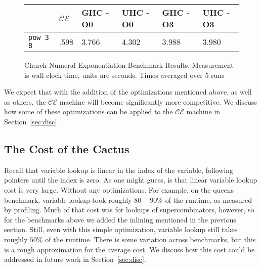 \begin{figure*}
\begin{tabularx}{\textwidth}{l | X | X | X | X | X}
& $\mathcal{CE}$ & GHC -O0 & UHC -O0 & GHC -O3 & UHC -O3 \\
\hline
\texttt{pow 3 8} & .598 & 3.766 & 4.302 & 3.988 & 3.980 \\
\end{tabularx}
\caption{Church Numeral Exponentiation Benchmark Results. Measurement is wall clock time, 
units are seconds. Times averaged over 5 runs}
\label{fig:res-church}
\end{figure*}

We expect that with the addition of the optimizations mentioned above, as well
as others, the $\mathcal{CE}$ machine will become significantly more
competitive. We discuss how some of these optimizations can be applied to the
$\mathcal{CE}$ machine in Section~\ref{sec:disc}.

\subsection{The Cost of the Cactus}

Recall that variable lookup is linear in the index of the variable, following
pointers until the index is zero. As one might guess, is that linear variable
lookup cost is very large. Without any optimizations. For example, on the queens
benchmark, variable lookup took roughly $80-90\%$ of the runtime, as measured by
profiling. Much of that cost was for lookups of supercombinators, however, so
for the benchmarks above we added the inlining mentioned in the previous
section. Still, even with this simple optimization, variable lookup still
takes roughly $50\%$ of the runtime. There is some variation across
benchmarks, but this is a rough approximation for the average cost. We discuss
how this cost could be addressed in future work in Section~\ref{sec:disc}.


